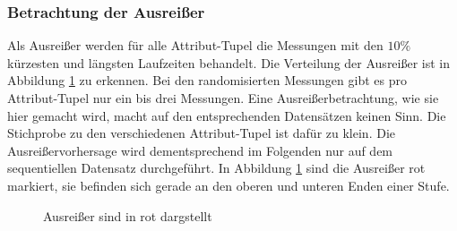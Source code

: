 \documentclass[
	12pt,
	a4paper,
	BCOR10mm,
	DIV14,
	listof=totoc,
	bibliography=totoc,
	headsepline
]{scrreprt}
\begin{document}
\subsubsection{Betrachtung der Ausreißer}
Als Ausreißer werden für alle Attribut-Tupel die Messungen mit den $10\%$ kürzesten und längsten Laufzeiten behandelt. Die Verteilung der Ausreißer ist in Abbildung \ref{fig:ausreisser} zu erkennen.
Bei den randomisierten Messungen gibt es pro Attribut-Tupel nur ein bis drei Messungen. Eine Ausreißerbetrachtung, wie sie hier gemacht wird, macht auf den entsprechenden Datensätzen keinen Sinn. Die Stichprobe zu den verschiedenen Attribut-Tupel ist dafür zu klein.
Die Ausreißervorhersage wird dementsprechend im Folgenden nur auf dem sequentiellen Datensatz durchgeführt.
In Abbildung \ref{fig:ausreisser} sind die Ausreißer rot markiert, sie befinden sich gerade an den oberen und unteren Enden einer Stufe.

\begin{figure}
	\centering
	\hfill
	\caption{Ausreißer sind in rot dargstellt}
	\label{fig:ausreisser}
\end{figure} 
\end{document}
